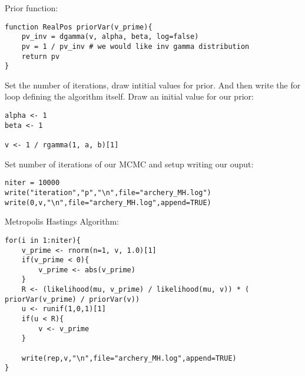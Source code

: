 Prior function: 

{\tt \begin{snugshade*}
 \begin{lstlisting}
function RealPos priorVar(v_prime){
	pv_inv = dgamma(v, alpha, beta, log=false)
	pv = 1 / pv_inv # we would like inv gamma distribution
	return pv
}
\end{lstlisting}
\end{snugshade*}}



Set the number of iterations, draw intitial values for prior. And then write the for loop defining the algorithm itself. 
Draw an initial value for our prior:

{\tt \begin{snugshade*}
 \begin{lstlisting}
alpha <- 1
beta <- 1

v <- 1 / rgamma(1, a, b)[1]
\end{lstlisting}
\end{snugshade*}}

Set number of iterations of our MCMC and setup writing our ouput:

{\tt \begin{snugshade*}
 \begin{lstlisting}
niter = 10000
write("iteration","p","\n",file="archery_MH.log")
write(0,v,"\n",file="archery_MH.log",append=TRUE)
\end{lstlisting}
\end{snugshade*}}


Metropolis Hastings Algorithm:

{\tt \begin{snugshade*}
 \begin{lstlisting}
for(i in 1:niter){
	v_prime <- rnorm(n=1, v, 1.0)[1]
	if(v_prime < 0){
		v_prime <- abs(v_prime)
	}
	R <- (likelihood(mu, v_prime) / likelihood(mu, v)) * ( priorVar(v_prime) / priorVar(v))
	u <- runif(1,0,1)[1]
	if(u < R){
		v <- v_prime
	}

	write(rep,v,"\n",file="archery_MH.log",append=TRUE)
}
\end{lstlisting}
\end{snugshade*}}




